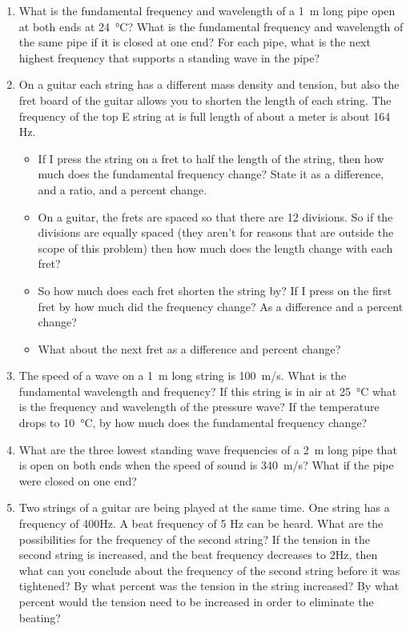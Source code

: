 \begin{enumerate}
	\item
	What is the fundamental frequency and wavelength of a \SI{1}{m} long pipe open at both ends at \SI{24}{\celsius}? What is the fundamental frequency and wavelength of the same pipe if it is closed at one end? For each pipe, what is the next highest frequency that supports a standing wave in the pipe?
	
	\item 
	On a guitar each string has a different mass density and tension, but also the fret board of the guitar allows you to shorten the length of each string. The frequency of the top E string at is full length of about a meter is about 164 Hz. 
	\begin{itemize}
		\setlength\itemsep{2 in}
		\item If I press the string on a fret to half the length of the string, then how much does the fundamental frequency change? State it as a difference, and a ratio, and a percent change.
		\item On a guitar, the frets are spaced so that there are 12 divisions. So if the divisions are equally spaced (they aren't for reasons that are outside the scope of this problem) then how much does the length change with each fret?
		\item So how much does each fret shorten the string by? If I press on the first fret by how much did the frequency change? As a difference and a percent change?
		\item What about the next fret as a difference and percent change?
	\end{itemize}
	
	\item
	The speed of a wave on a \SI{1}{\meter} long string is \SI{100}{m/s}. What is the fundamental wavelength and frequency? If this string is in air at \SI{25}{\celsius} what is the frequency and wavelength of the pressure wave? If the temperature drops to \SI{10}{\celsius}, by how much does the fundamental frequency change?
	
	\item
	What are the three lowest standing wave frequencies of a \SI{2}{m} long pipe that is open on both ends when the speed of sound is \SI{340}{m/s}? What if the pipe were closed on one end?
	
	\item
	Two strings of a guitar are being played at the same time. One string has a frequency of 400Hz. A beat frequency of 5 Hz can be heard. What are the possibilities for the frequency of the second string? If the tension in the second string is increased, and the beat frequency decreases to 2Hz, then what can you conclude about the frequency of the second string before it was tightened? By what percent was the tension in the string increased? By what percent would the tension need to be increased in order to eliminate the beating?
	

\end{enumerate}
